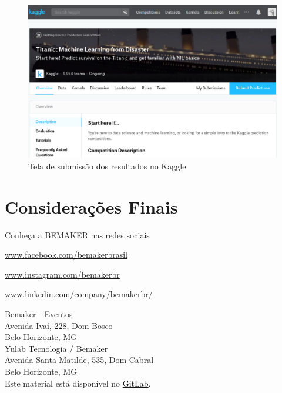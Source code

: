 \documentclass[a4paper,12pt]{report}
\begin{document}
\begin{figure}[h]
	\includegraphics[width=\textwidth]{Submissao_Kaggle.pdf}
	\caption{Tela de submissão dos resultados no Kaggle.}
	\label{Fig:Submissao_KAGGLE}
\end{figure}


\chapter{Considerações Finais}

Conheça a BEMAKER nas redes sociais

\href{https://www.facebook.com/bemakerbrasil}{www.facebook.com/bemakerbrasil}

\href{https://www.instagram.com/bemakerbr}{www.instagram.com/bemakerbr}

\href{https://www.linkedin.com/company/bemakerbr/}{www.linkedin.com/company/bemakerbr/}

Bemaker - Eventos\\
Avenida Ivaí, 228, Dom Bosco\\
Belo Horizonte, MG \\

Yulab Tecnologia / Bemaker\\
Avenida Santa Matilde, 535, Dom Cabral\\
Belo Horizonte, MG \\

Este material está disponível no \href{https://gitlab.com/adelinocpp/material_didatico_workshop_machine_learning}{GitLab}.


\end{document}
